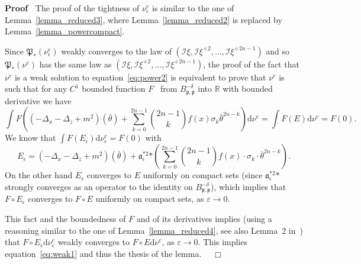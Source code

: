 \documentclass[a4paper,10pt]{article}
\newcommand{\asterisk}{\mathord{*}}
\newcommand{\mathd}{\mathrm{d}}
\newenvironment{proof}{\noindent\textbf{Proof\ }}{\hspace*{\fill}$\Box$\medskip}
\begin{document}
\begin{proof}
  The proof of the tightness of $\nu_{\epsilon}^e$ is similar to the one of
  Lemma~\ref{lemma_reduced3}, where Lemma~\ref{lemma_reduced2} is replaced by
  Lemma~\ref{lemma_powercompact}.
  
  Since $\mathfrak{P}_{\asterisk} (\nu_{\epsilon}^e)$ weakly converges to the
  law of $(\mathcal{I} \xi, \mathcal{I} \xi^{\diamond 2}, \ldots, \mathcal{I}
  \xi^{\diamond 2 n - 1})$ and so $\mathfrak{P}_{\asterisk} (\nu^e)$ has the
  same law as $(\mathcal{I} \xi, \mathcal{I} \xi^{\diamond 2}, \ldots,
  \mathcal{I} \xi^{\diamond 2 n - 1})$, the proof of the fact that $\nu^e$ is
  a weak solution to equation~{\eqref{eq:power2}} is equivalent to prove that
  $\nu^e$ is such that for any $C^1$ bounded function $F$ \ from $B^{-
  \delta}_{\mathfrak{p}, \mathfrak{p}}$ into $\mathbb{R}$ with bounded
  derivative we have
  \begin{equation}
    \int F \left( (- \Delta_x - \Delta_z + m^2) (\bar{\theta}) + \mathfrak{}
    \sum_{k = 0}^{2 n - 1} \binom{2 n - 1}{k} f (x) \sigma_k \bar{\theta}^{2 n
    - k} \right) \mathd \nu^e = \int F (E) \mathd \nu^e = F (0) .
    \label{eq:weak1}
  \end{equation}
  We know that $\int F (E_{\epsilon}) \mathd \nu_{\epsilon}^e = F (0)$ with
  \[ E_{\epsilon} = (- \Delta_x - \Delta_z + m^2) (\bar{\theta}) +
     \mathfrak{a}^{\asterisk 2}_{\epsilon} \asterisk \left( \sum_{k = 0}^{2 n
     - 1} \binom{2 n - 1}{k} f (x) \cdot \sigma_k \cdot \bar{\theta}^{2 n - k}
     \right) . \]
  On the other hand $E_{\epsilon}$ converges to $E$ uniformly on compact sets
  (since $\mathfrak{a}_{\epsilon}^{\asterisk 2} \asterisk$ strongly converges
  as an operator to the identity on $B^{- \delta}_{\mathfrak{p},
  \mathfrak{p}}$), which implies that $F \circ E_{\epsilon}$ converges to $F
  \circ E$ uniformly on compact sets, as $\varepsilon \rightarrow 0$.
  
  This fact and the boundedness of $F$ and of its derivatives implies (using a
  reasoning similar to the one of Lemma~\ref{lemma_reduced4}, see also Lemma~2
  in~{\cite{Albeverio2018elliptic}}) that $F \circ E_{\epsilon} \mathd
  \nu_{\epsilon}^e$ weakly converges to $F \circ E \mathd \nu^e$, as
  $\varepsilon \rightarrow 0$. This implies equation~{\eqref{eq:weak1}} and
  thus the thesis of the lemma. \ \ 
\end{proof}
\end{document}
